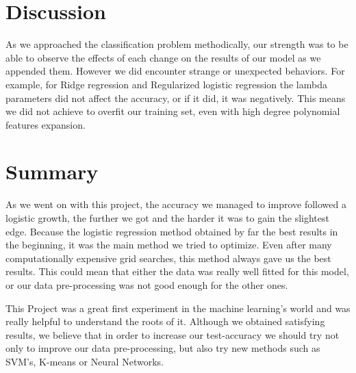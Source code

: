 \documentclass[10pt,conference,compsocconf]{IEEEtran}
\begin{document}
\begin{table}[h]
    \caption{Finals results and finals parameters.}

\end{table}


\section{Discussion}
As we approached the classification problem methodically, our strength was to be able to observe the effects of each change on the results of our model as we appended them. However we did encounter strange or unexpected behaviors. For example, for Ridge regression and Regularized logistic regression the lambda parameters did not affect the accuracy, or if it did, it was negatively. This means we did not achieve to overfit our training set, even with high degree polynomial features expansion.
\section{Summary}
As we went on with this project, the accuracy we managed to improve followed a logistic growth, the further we got and the harder it was to gain the slightest edge. Because the logistic regression method obtained by far the best results in the beginning, it was the main method we tried to optimize. Even after many computationally expensive grid searches, this method always gave us the best results. This could mean that either the data was really well fitted for this model, or our data pre-processing was not good enough for the other ones. 

This Project was a great first experiment in the machine learning's world and was really helpful to understand the roots of it. Although we obtained satisfying results, we believe that in order to increase our test-accuracy we should try not only to improve our data pre-processing, but also try new methods such as SVM's, K-means or Neural Networks. 



\end{document}
